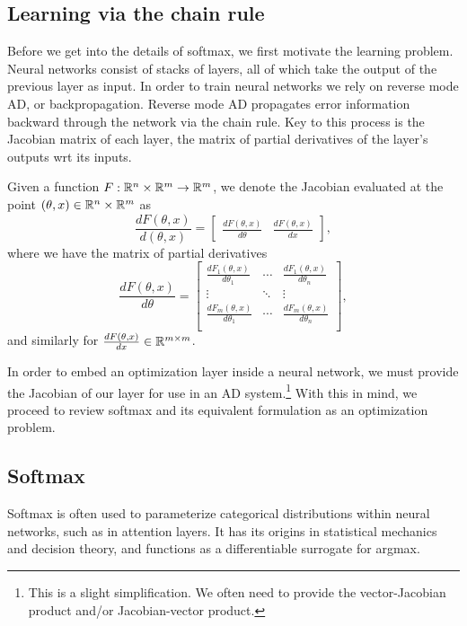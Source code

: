 \documentclass[11pt]{article}
\begin{document}
\subsection{Learning via the chain rule}
Before we get into the details of softmax, we first motivate the learning problem.
Neural networks consist of stacks of layers,
all of which take the output of the previous layer as input.
In order to train neural networks we rely on reverse mode AD, or backpropagation.
Reverse mode AD propagates error information backward through the network via the chain rule.
Key to this process is the Jacobian matrix of each layer, the matrix of partial derivatives
of the layer's outputs wrt its inputs.

Given a function $F:\mathbb{R}^n\times\mathbb{R}^m\to\mathbb{R}^m$, we denote the Jacobian evaluated at
the point $(\theta,x)\in\mathbb{R}^n\times\mathbb{R}^m$ as
\begin{equation*}
\frac{dF(\theta,x)}{d(\theta,x)} = \begin{bmatrix}
    \frac{dF(\theta,x)}{d\theta} &\frac{dF(\theta,x)}{dx} 
\end{bmatrix},
\end{equation*}
where we have the matrix of partial derivatives
\begin{equation*}
\frac{dF(\theta,x)}{d\theta} = \begin{bmatrix}
    \frac{dF_1(\theta,x)}{d\theta_1} & \cdots & \frac{dF_1(\theta,x)}{d\theta_n} \\
    \vdots & \ddots & \vdots \\
    \frac{dF_m(\theta,x)}{d\theta_1} & \cdots & \frac{dF_m(\theta,x)}{d\theta_n} \\
\end{bmatrix},
\end{equation*}
and similarly for $\frac{dF(\theta,x)}{dx}\in\mathbb{R}^{m\times m}$.

In order to embed an optimization layer inside a neural network,
we must provide the Jacobian of our layer for use in an AD system.\footnote{
This is a slight simplification. We often need to provide the vector-Jacobian product
and/or Jacobian-vector product.
}
With this in mind, we proceed to review softmax and its equivalent formulation
as an optimization problem.

\subsection{Softmax}
Softmax is often used to parameterize categorical distributions within neural networks,
such as in attention layers.
It has its origins in statistical mechanics and decision theory, and functions
as a differentiable surrogate for argmax.
\end{document}
